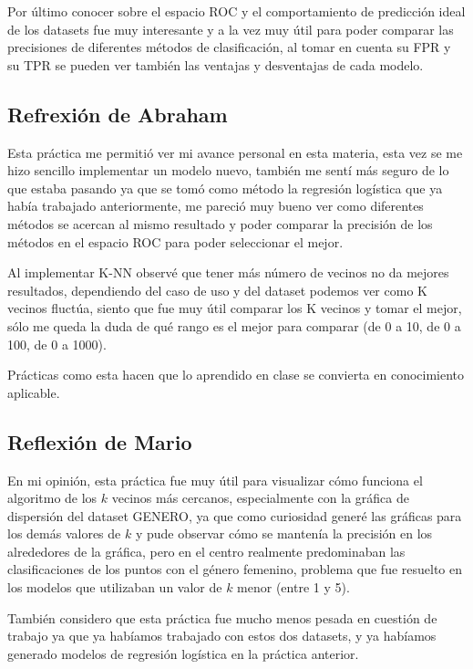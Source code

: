 \documentclass[sigconf,authorversion,nonacm]{acmart}
\begin{document}
Por último conocer sobre el espacio ROC y el comportamiento de predicción ideal de los datasets fue muy interesante y a la vez muy útil para poder comparar las precisiones de diferentes métodos de clasificación, al tomar en cuenta su FPR y su TPR se pueden ver también las ventajas y desventajas de cada modelo.

\subsection{Refrexión de Abraham}
Esta práctica me permitió ver mi avance personal en esta materia, esta vez se me hizo sencillo implementar un modelo nuevo, también me sentí más seguro de lo que estaba pasando ya que se tomó como método la regresión logística que ya había trabajado anteriormente, me pareció muy bueno ver como diferentes métodos se acercan al mismo resultado y poder comparar la precisión de los métodos en el espacio ROC para poder seleccionar el mejor.

Al implementar K-NN observé que tener más número de vecinos no da mejores resultados, dependiendo del caso de uso y del dataset podemos ver como K vecinos fluctúa, siento que fue muy útil comparar los K vecinos y tomar el mejor, sólo me queda la duda de qué rango es el mejor para comparar (de 0 a 10, de 0 a 100, de 0 a 1000).

Prácticas como esta hacen que lo aprendido en clase se convierta en conocimiento aplicable.

\subsection{Reflexión de Mario}
En mi opinión, esta práctica fue muy útil para visualizar cómo funciona el algoritmo de los $k$ vecinos más cercanos, especialmente con la gráfica de dispersión del dataset GENERO, ya que como curiosidad generé las gráficas para los demás valores de $k$ y pude observar cómo se mantenía la precisión en los alrededores de la gráfica, pero en el centro realmente predominaban las clasificaciones de los puntos con el género femenino, problema que fue resuelto en los modelos que utilizaban un valor de $k$ menor (entre 1 y 5).

También considero que esta práctica fue mucho menos pesada en cuestión de trabajo ya que ya habíamos trabajado con estos dos datasets, y ya habíamos generado modelos de regresión logística en la práctica anterior.




\end{document}
